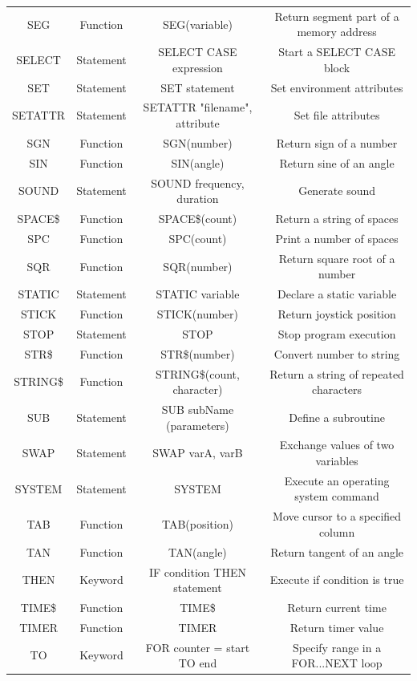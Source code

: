 \documentclass[10pt, reqno]{exam}
\begin{document}
{\begin{longtable}{|c|c|c|c|}
    SEG & Function & SEG(variable) & Return segment part of a memory address \\
    SELECT & Statement & SELECT CASE expression & Start a SELECT CASE block \\
    SET & Statement & SET statement & Set environment attributes \\
    SETATTR & Statement & SETATTR "filename", attribute & Set file attributes \\
    SGN & Function & SGN(number) & Return sign of a number \\
    SIN & Function & SIN(angle) & Return sine of an angle \\
    SOUND & Statement & SOUND frequency, duration & Generate sound \\
    SPACE\$ & Function & SPACE\$(count) & Return a string of spaces \\
    SPC & Function & SPC(count) & Print a number of spaces \\
    SQR & Function & SQR(number) & Return square root of a number \\
    STATIC & Statement & STATIC variable & Declare a static variable \\
    STICK & Function & STICK(number) & Return joystick position \\
    STOP & Statement & STOP & Stop program execution \\
    STR\$ & Function & STR\$(number) & Convert number to string \\
    STRING\$ & Function & STRING\$(count, character) & Return a string of repeated characters \\
    SUB & Statement & SUB subName (parameters) & Define a subroutine \\
    SWAP & Statement & SWAP varA, varB & Exchange values of two variables \\
    SYSTEM & Statement & SYSTEM & Execute an operating system command \\
    TAB & Function & TAB(position) & Move cursor to a specified column \\
    TAN & Function & TAN(angle) & Return tangent of an angle \\
    THEN & Keyword & IF condition THEN statement & Execute if condition is true \\
    TIME\$ & Function & TIME\$ & Return current time \\
    TIMER & Function & TIMER & Return timer value \\
    TO & Keyword & FOR counter = start TO end & Specify range in a FOR...NEXT loop \\

\end{longtable}}
\end{document}
